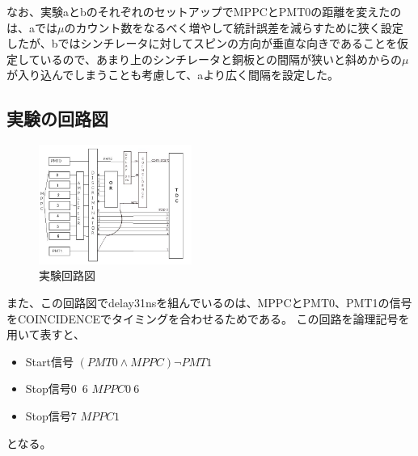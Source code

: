 なお、実験aとbのそれぞれのセットアップでMPPCとPMT0の距離を変えたのは、aでは$\mu$のカウント数をなるべく増やして統計誤差を減らすために狭く設定したが、bではシンチレータに対してスピンの方向が垂直な向きであることを仮定しているので、あまり上のシンチレータと銅板との間隔が狭いと斜めからの$\mu$が入り込んでしまうことも考慮して、aより広く間隔を設定した。
\subsection{実験の回路図}
\begin{figure}[htbm]
  \includegraphics[width=5cm, bb=0 0 640 500]{kairo.jpg}
  \caption{実験回路図}
\end{figure}
また、この回路図でdelay31nsを組んでいるのは、MPPCとPMT0、PMT1の信号をCOINCIDENCEでタイミングを合わせるためである。
この回路を論理記号を用いて表すと、
\begin{itemize}
  \item Start信号 $(PMT0 \land MPPC)\lnot PMT1 $
  \item Stop信号0~6 $ MPPC 0~6 $
  \item Stop信号7 $ MPPC1 $
\end{itemize}
となる。

